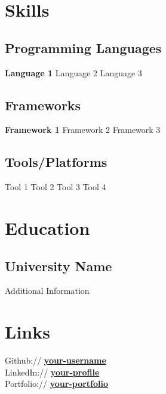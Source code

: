 \documentclass[]{hanisntsolo-resume}
\begin{document}
\begin{minipage}[t]{0.33\textwidth}


\section{Skills}
\subsection{Programming Languages}
\textbf{Language 1} \textbullet{} Language 2 \textbullet{} Language 3

\subsection{Frameworks}
\textbf{Framework 1} \textbullet{} Framework 2 \textbullet{} Framework 3

\subsection{Tools/Platforms}
Tool 1 \textbullet{} Tool 2 \textbullet{} Tool 3 \textbullet{} Tool 4

\sectionsep


\section{Education}

\subsection{University Name}
Additional Information\\
\sectionsep


\section{Links} 
Github:// \href{https://github.com/your-username}{\bf your-username} \\
LinkedIn://  \href{https://www.linkedin.com/in/your-profile}{\bf your-profile} \\
Portfolio://  \href{https://your-portfolio.com}{\bf your-portfolio}


\end{minipage}
\end{document}
